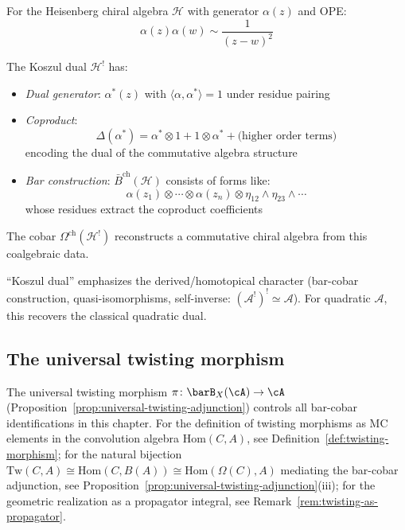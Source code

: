 \begin{example}
For the Heisenberg chiral algebra $\mathcal{H}$ with generator $\alpha(z)$ and OPE:
\[\alpha(z)\alpha(w) \sim \frac{1}{(z-w)^2}\]

The Koszul dual $\mathcal{H}^!$ has:
\begin{itemize}
\item \emph{Dual generator}: $\alpha^*(z)$ with $\langle \alpha, \alpha^* \rangle = 1$ under residue pairing
\item \emph{Coproduct}: 
   \[\Delta(\alpha^*) = \alpha^* \otimes 1 + 1 \otimes \alpha^* + \text{(higher order terms)}\]
   encoding the dual of the commutative algebra structure
\item \emph{Bar construction}: $\bar{B}^{\text{ch}}(\mathcal{H})$ consists of forms like:
   \[\alpha(z_1) \otimes \cdots \otimes \alpha(z_n) \otimes \eta_{12} \wedge \eta_{23} \wedge \cdots\]
   whose residues extract the coproduct coefficients
\end{itemize}

The cobar $\Omega^{\text{ch}}(\mathcal{H}^!)$ reconstructs a commutative chiral algebra from this coalgebraic data.
\end{example}

\begin{remark}
``Koszul dual'' emphasizes the derived/homotopical character
(bar-cobar construction, quasi-isomorphisms, self-inverse:
$(\mathcal{A}^!)^! \simeq \mathcal{A}$).  For quadratic $\mathcal{A}$,
this recovers the classical quadratic dual.
\end{remark}

\subsection{The universal twisting morphism}

The universal twisting morphism
$\pi\colon \barB_X(\cA) \to \cA$
(Proposition~\ref{prop:universal-twisting-adjunction}) controls
all bar-cobar identifications in this chapter.  For the definition
of twisting morphisms as MC elements in the convolution
algebra $\mathrm{Hom}(C, A)$, see
Definition~\ref{def:twisting-morphism}; for the natural bijection
$\mathrm{Tw}(C, A) \cong \mathrm{Hom}(C, B(A)) \cong
\mathrm{Hom}(\Omega(C), A)$
mediating the bar-cobar adjunction, see
Proposition~\ref{prop:universal-twisting-adjunction}(iii); for the
geometric realization as a propagator integral, see
Remark~\ref{rem:twisting-as-propagator}.


